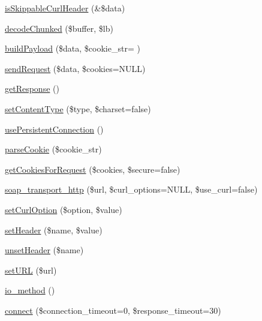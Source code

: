\begin{DoxyCompactItemize}
\item 
\hyperlink{classsoap__transport__http_af7443369371a7caf67c04b09c6da774a}{is\+Skippable\+Curl\+Header} (\&\$data)
\item 
\hyperlink{classsoap__transport__http_a6dc9ad42ffb3aaea279c0ee16c4068b2}{decode\+Chunked} (\$buffer, \$lb)
\item 
\hyperlink{classsoap__transport__http_a3aaa5b45b7d75364bccaf3918a5ce908}{build\+Payload} (\$data, \$cookie\+\_\+str= \textquotesingle{}\textquotesingle{})
\item 
\hyperlink{classsoap__transport__http_a58f0210b24415cdc753d31b425a406be}{send\+Request} (\$data, \$cookies=N\+U\+L\+L)
\item 
\hyperlink{classsoap__transport__http_a6c907e8af775e517a77037dd0164222f}{get\+Response} ()
\item 
\hyperlink{classsoap__transport__http_a1d16955b48732c7b979b7d2ccaea34c8}{set\+Content\+Type} (\$type, \$charset=false)
\item 
\hyperlink{classsoap__transport__http_a8ae21fdc1993b8741956e86fc58c12b1}{use\+Persistent\+Connection} ()
\item 
\hyperlink{classsoap__transport__http_ae8e635ed6f4df1ef3f9329f1103b6941}{parse\+Cookie} (\$cookie\+\_\+str)
\item 
\hyperlink{classsoap__transport__http_a51e28e678d231bebb7de006262c31887}{get\+Cookies\+For\+Request} (\$cookies, \$secure=false)
\item 
\hyperlink{classsoap__transport__http_aa723d51da4074927836863877821ecfd}{soap\+\_\+transport\+\_\+http} (\$url, \$curl\+\_\+options=N\+U\+L\+L, \$use\+\_\+curl=false)
\item 
\hyperlink{classsoap__transport__http_a314f6d38ace6f3d92d0d1d7e8cfc0aaf}{set\+Curl\+Option} (\$option, \$value)
\item 
\hyperlink{classsoap__transport__http_a48ca020ea3da5f108feab0fa8efde068}{set\+Header} (\$name, \$value)
\item 
\hyperlink{classsoap__transport__http_ab3e7f395271d99fe451c42201519c2a9}{unset\+Header} (\$name)
\item 
\hyperlink{classsoap__transport__http_a5a4415db7a7e36f85a4d975c892b0470}{set\+U\+R\+L} (\$url)
\item 
\hyperlink{classsoap__transport__http_a83b4320b3379e742a3d064effff0728a}{io\+\_\+method} ()
\item 
\hyperlink{classsoap__transport__http_a8648865ea5c701e29c03c79af40a7ffc}{connect} (\$connection\+\_\+timeout=0, \$response\+\_\+timeout=30)

\end{DoxyCompactItemize}
